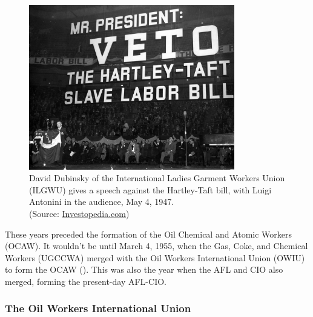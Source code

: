 \documentclass[12pt]{article}
\newcommand{\imageWidth}{0.8\textwidth}
\begin{document}
\begin{figure}[ht]
  \centering
  \includegraphics[width=\imageWidth]{images/slave_labor_bill}
  \captionsetup{justification=centering, singlelinecheck=false, margin=2cm} 
  \caption[Anti-Hartley-Taft Rally]{David Dubinsky of the International Ladies Garment Workers Union (ILGWU) gives a speech against the Hartley-Taft bill, with Luigi Antonini in the audience, May 4, 1947.\\ (Source: \href{https://www.investopedia.com/thmb/VcswppMRTl8IqMbgLRqdigfIGvs=/1500x0/filters:no_upscale():max_bytes(150000):strip_icc()/5278798677_0429e6aa05_k-7b6b81bdbbe44cdb929c08c7da9f8d29.jpg}{Investopedia.com}) \nocite{investopediaMrPresidentVeto}}
  \label{fig:slave_labor_bill}
\end{figure}

These years preceded the formation of the Oil Chemical and Atomic Workers (OCAW). It wouldn’t be until March 4, 1955, when the Gas, Coke, and Chemical Workers (UGCCWA) merged with the Oil Workers International Union (OWIU) to form the OCAW (\cite[48]{ocawFactBookOil1960}). This was also the year when the AFL and CIO also merged, forming the present-day AFL-CIO.

\subsubsection{The Oil Workers International Union}
\end{document}
